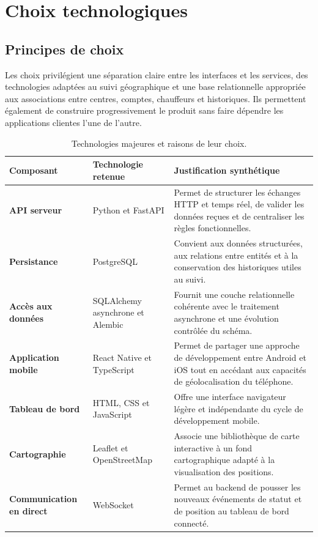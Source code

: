 \documentclass[11pt,a4paper,oneside]{report}
\begin{document}
\chapter{Choix technologiques}

\section{Principes de choix}

Les choix privilégient une séparation claire entre les interfaces et les
services, des technologies adaptées au suivi géographique et une base
relationnelle appropriée aux associations entre centres, comptes, chauffeurs
et historiques. Ils permettent également de construire progressivement le
produit sans faire dépendre les applications clientes l'une de l'autre.

\begin{table}[htbp]
\centering
\small
\begin{tabularx}{\linewidth}{>{\bfseries}p{3.2cm} X X}
\toprule
Composant & Technologie retenue & Justification synthétique \\
\midrule
API serveur & Python et FastAPI & Permet de structurer les échanges HTTP et
temps réel, de valider les données reçues et de centraliser les règles
fonctionnelles. \\
Persistance & PostgreSQL & Convient aux données structurées, aux relations
entre entités et à la conservation des historiques utiles au suivi. \\
Accès aux données & SQLAlchemy asynchrone et Alembic & Fournit une couche
relationnelle cohérente avec le traitement asynchrone et une évolution
contrôlée du schéma. \\
Application mobile & React Native et TypeScript & Permet de partager une
approche de développement entre Android et iOS tout en accédant aux capacités
de géolocalisation du téléphone. \\
Tableau de bord & HTML, CSS et JavaScript & Offre une interface navigateur
légère et indépendante du cycle de développement mobile. \\
Cartographie & Leaflet et OpenStreetMap & Associe une bibliothèque de carte
interactive à un fond cartographique adapté à la visualisation des positions. \\
Communication en direct & WebSocket & Permet au backend de pousser les nouveaux
événements de statut et de position au tableau de bord connecté. \\
\bottomrule
\end{tabularx}
\caption{Technologies majeures et raisons de leur choix.}
\label{tab:stack}
\end{table}
\end{document}

